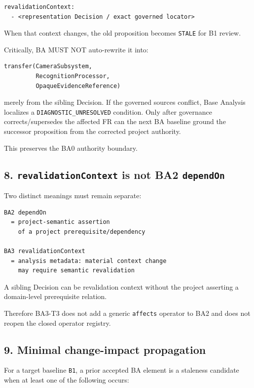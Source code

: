 \documentclass[11pt,a4paper]{article}
\begin{document}
\begin{verbatim}
revalidationContext:
  - <representation Decision / exact governed locator>
\end{verbatim}

When that context changes, the old proposition becomes \texttt{STALE}
for B1 review.

Critically, BA MUST NOT auto-rewrite it into:

\begin{verbatim}
transfer(CameraSubsystem,
         RecognitionProcessor,
         OpaqueEvidenceReference)
\end{verbatim}

merely from the sibling Decision. If the governed sources conflict, Base
Analysis localizes a \texttt{DIAGNOSTIC\_UNRESOLVED} condition. Only
after governance corrects/supersedes the affected FR can the next BA
baseline ground the successor proposition from the corrected project
authority.

This preserves the BA0 authority boundary.

\subsection{\texorpdfstring{8. \texttt{revalidationContext} is not BA2
\texttt{dependOn}}{8. revalidationContext is not BA2 dependOn}}\label{revalidationcontext-is-not-ba2-dependon}

Two distinct meanings must remain separate:

\begin{verbatim}
BA2 dependOn
  = project-semantic assertion
    of a project prerequisite/dependency

BA3 revalidationContext
  = analysis metadata: material context change
    may require semantic revalidation
\end{verbatim}

A sibling Decision can be revalidation context without the project
asserting a domain-level prerequisite relation.

Therefore BA3-T3 does not add a generic \texttt{affects} operator to BA2
and does not reopen the closed operator registry.

\subsection{9. Minimal change-impact
propagation}\label{minimal-change-impact-propagation}

For a target baseline \texttt{B1}, a prior accepted BA element is a
staleness candidate when at least one of the following occurs:
\end{document}
